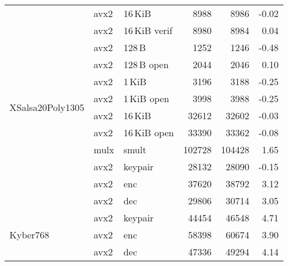 \begin{table}
\begin{tabular}{lllrrr}
 & avx2 & 16\,KiB       & 8988
                        & 8986
                        & -0.02 \\

 & avx2 & 16\,KiB verif & 8980
                        & 8984
                        & 0.04 \\

      \midrule
    \multirow{8}{*}{XSalsa20Poly1305}

 & avx2 & 128\,B        & 1252
                        & 1246
                        & -0.48 \\

 & avx2 & 128\,B open   & 2044
                        & 2046
                        & 0.10 \\

 & avx2 & 1\,KiB        & 3196
                        & 3188
                        & -0.25 \\

 & avx2 & 1\,KiB open   & 3998
                        & 3988
                        & -0.25 \\

 & avx2 & 16\,KiB       & 32612
                        & 32602
                        & -0.03 \\

 & avx2 & 16\,KiB open  & 33390
                        & 33362
                        & -0.08 \\

      \midrule
    \multirow{1}{*}{X25519}
 & mulx & smult         & 102728
                        & 104428
                        & 1.65 \\

      \midrule
    \multirow{3}{*}{Kyber512}
 & avx2 & keypair       & 28132
                        & 28090
                        & -0.15 \\

 & avx2 & enc           & 37620
                        & 38792
                        & 3.12 \\

 & avx2 & dec           & 29806
                        & 30714
                        & 3.05 \\

      \midrule
    \multirow{3}{*}{Kyber768}
 & avx2 & keypair       & 44454
                        & 46548
                        & 4.71 \\

 & avx2 & enc           & 58398
                        & 60674
                        & 3.90 \\

 & avx2 & dec           & 47336
                        & 49294
                        & 4.14 \\
  \bottomrule
  \end{tabular}
\end{table}

